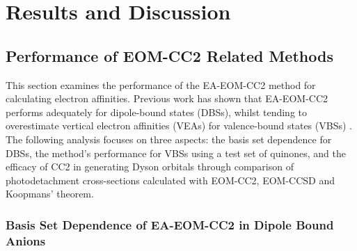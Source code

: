 \chapter{Results and Discussion}

\section{Performance of EOM-CC2 Related Methods}
This section examines the performance of the EA-EOM-CC2 method for calculating electron affinities. Previous work has shown that EA-EOM-CC2 performs adequately for dipole-bound states (DBSs), whilst tending to overestimate vertical electron affinities (VEAs) for valence-bound states (VBSs) \cite{paran2024performance}. The following analysis focuses on three aspects: the basis set dependence for DBSs, the method's performance for VBSs using a test set of quinones, and the efficacy of CC2 in generating Dyson orbitals through comparison of photodetachment cross-sections calculated with EOM-CC2, EOM-CCSD and Koopmans' theorem.

\subsection{Basis Set Dependence of EA-EOM-CC2 in Dipole Bound Anions}

